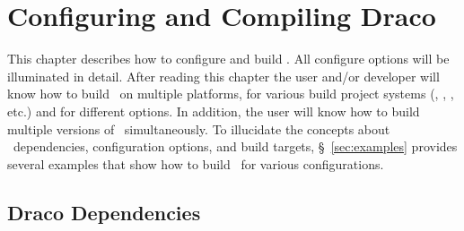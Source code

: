 
\chapter{Configuring and Compiling Draco}
\label{chap:compile}

This chapter describes how to configure and build \draco.  All
configure options will be illuminated in detail.  After reading this
chapter the user and/or developer will know how to build \draco\ on
multiple platforms, for various build project systems (, , , etc.) and for different options.  In addition, the user
will know how to build multiple versions of \draco\ simultaneously.
To illucidate the concepts about \draco\ dependencies, configuration
options, and build targets, \S~\ref{sec:examples} provides several
examples that show how to build \draco\ for various configurations.


\section{Draco Dependencies}
\label{sec:draco_dependencies}

